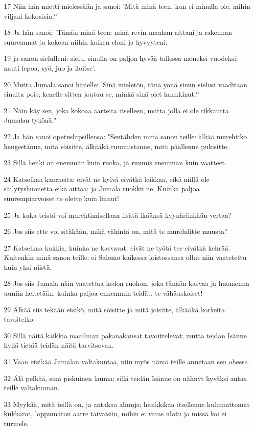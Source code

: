 \par 17 Niin hän mietti mielessään ja sanoi: 'Mitä minä teen, kun ei minulla ole, mihin viljani kokoaisin?'
\par 18 Ja hän sanoi: 'Tämän minä teen: minä revin maahan aittani ja rakennan suuremmat ja kokoan niihin kaiken eloni ja hyvyyteni;
\par 19 ja sanon sielulleni: sielu, sinulla on paljon hyvää tallessa moneksi vuodeksi; nauti lepoa, syö, juo ja iloitse'.
\par 20 Mutta Jumala sanoi hänelle: 'Sinä mieletön, tänä yönä sinun sielusi vaaditaan sinulta pois; kenelle sitten joutuu se, minkä sinä olet hankkinut?'
\par 21 Näin käy sen, joka kokoaa aarteita itselleen, mutta jolla ei ole rikkautta Jumalan tykönä."
\par 22 Ja hän sanoi opetuslapsillensa: "Sentähden minä sanon teille: älkää murehtiko hengestänne, mitä söisitte, älkääkä ruumiistanne, mitä päällenne pukisitte.
\par 23 Sillä henki on enemmän kuin ruoka, ja ruumis enemmän kuin vaatteet.
\par 24 Katselkaa kaarneita: eivät ne kylvä eivätkä leikkaa, eikä niillä ole säilytyshuonetta eikä aittaa; ja Jumala ruokkii ne. Kuinka paljoa suurempiarvoiset te olette kuin linnut!
\par 25 Ja kuka teistä voi murehtimisellaan lisätä ikäänsä kyynäränkään vertaa?
\par 26 Jos siis ette voi sitäkään, mikä vähintä on, mitä te murehditte muusta?
\par 27 Katselkaa kukkia, kuinka ne kasvavat: eivät ne työtä tee eivätkä kehrää. Kuitenkin minä sanon teille: ei Salomo kaikessa loistossansa ollut niin vaatetettu kuin yksi niistä.
\par 28 Jos siis Jumala näin vaatettaa kedon ruohon, joka tänään kasvaa ja huomenna uuniin heitetään, kuinka paljoa ennemmin teidät, te vähäuskoiset!
\par 29 Älkää siis tekään etsikö, mitä söisitte ja mitä joisitte, älkääkä korkeita tavoitelko.
\par 30 Sillä näitä kaikkia maailman pakanakansat tavoittelevat; mutta teidän Isänne kyllä tietää teidän näitä tarvitsevan.
\par 31 Vaan etsikää Jumalan valtakuntaa, niin myös nämä teille annetaan sen ohessa.
\par 32 Älä pelkää, sinä piskuinen lauma; sillä teidän Isänne on nähnyt hyväksi antaa teille valtakunnan.
\par 33 Myykää, mitä teillä on, ja antakaa almuja; hankkikaa itsellenne kulumattomat kukkarot, loppumaton aarre taivaisiin, mihin ei varas ulotu ja missä koi ei turmele.
